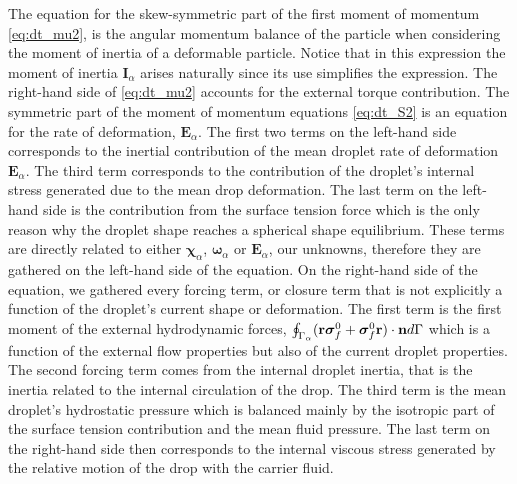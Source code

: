 The equation for the skew-symmetric part of the first moment of momentum \ref{eq:dt_mu2}, is the angular momentum balance of the particle when considering the moment of inertia of a deformable particle.
Notice that in this expression the moment of inertia $\textbf{I}_\alpha$ arises naturally since its use simplifies the expression. 
The right-hand side of \ref{eq:dt_mu2} accounts for the external torque contribution. 
The symmetric part of the moment of momentum equations \ref{eq:dt_S2} is an equation for the rate of deformation, $\textbf{E}_\alpha$. 
The first two terms on the left-hand side corresponds to the inertial contribution of the mean droplet rate of deformation $\textbf{E}_\alpha$. 
The third term corresponds to the contribution of the droplet's internal stress generated due to the mean drop deformation. 
The last term on the left-hand side is the contribution from the surface tension force which is the only reason why the droplet shape reaches a spherical shape equilibrium. 
These terms are directly related to either $\bm\chi_\alpha$, $\bm\omega_\alpha$ or $\textbf{E}_\alpha$, our unknowns, therefore they are gathered on the left-hand side of the equation. 
On the right-hand side of the equation, we gathered every forcing term, or closure term that is not explicitly a function of the droplet's current shape or deformation.  
The first term is the first moment of the external hydrodynamic forces, $\oint_{\Gamma_{\alpha}} (\textbf{r}\bm\sigma_f^0+ \bm\sigma_f^0\textbf{r})\cdot \textbf{n} d\Gamma$ which is a function of the external flow properties but also of the current droplet properties. 
The second forcing term comes from the internal droplet inertia, that is the inertia related to the internal circulation of the drop. 
The third term is the mean droplet's hydrostatic pressure which is balanced mainly by the isotropic part of the surface tension contribution and the mean fluid pressure. 
The last term on the right-hand side then corresponds to the internal viscous stress generated by the relative motion of the drop with the carrier fluid. 

